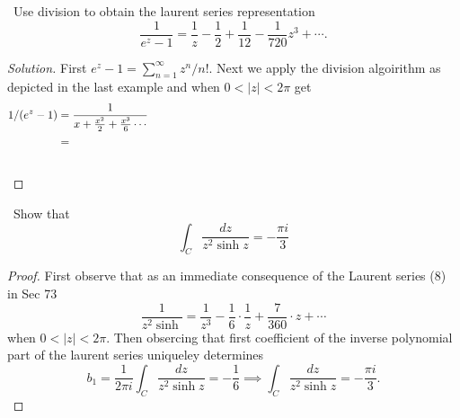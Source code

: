 \documentclass[11pt]{amsart}
\theoremstyle{definition}
\numberwithin{theorem}{section}
\numberwithin{definition}{section}
\numberwithin{equation}{section}
\newenvironment{solution}
  {\begin{proof}[Solution]}
  {\end{proof}}
\begin{document}
\medskip {}\ Use division to obtain the laurent series representation
\begin{equation*}
 	\frac{1}{e^z - 1} = \frac{1}{z} - \frac{1}{2 } + \frac{1}{12} - \frac{1}{720}z^3 + \cdots.
 \end{equation*} 
 \begin{solution}
 	First $e^z -1 = \sum_{n=1}^\infty z^n/n!$. Next 
 	we apply the division algoirithm as depicted in the last example and when $0 < |z| < 2\pi$ get
 	\begin{equation*}
 	\begin{aligned}
 		1/(e^z - 1) &= \frac{1}{x + \frac{x^2}{2} + \frac{x^3}{6} \cdots } \;\;\;\;\;\;\;\;\;\;\;\;\;\;\;\;\;\;\;\;\;\;\;\;\;\;\;\;\;\;\;\;\;\;\;\;\;\;\;\;\;\;\;\;\;\;\;\;\;\;\;\;\;\;\;\;\;\;\;\;\;\;\;\;\;\;\;\;\;\;\;\;\;\;\;\;\;\;\;\;\;\;\;\;\;\;\;\;\;\;\;\;\;\;\;\;\;\;\;\;\hfill\\
 		&=
 	\end{aligned}
 	\end{equation*} \\[4in]
 \end{solution}

\medskip {}\ Show that \begin{equation*}
	\int_C \frac{dz}{z^2 \sinh z} = -\frac{\pi i}{3}
\end{equation*} 
\begin{proof}
	First observe that as an immediate consequence of the Laurent series (8) in Sec 73 \begin{equation*}
		\frac{1}{z^2 \sinh} = \frac{1}{z^3 } - \frac{1}{6}\cdot \frac{1}{z} + \frac{7}{360}\cdot z + \cdots
	\end{equation*}
	when $0 < |z| < 2\pi.$ Then obsercing that first  coefficient of the inverse polynomial part of the laurent series uniqueley determines
	\begin{equation*}
		b_1 = \frac{1}{2\pi i} \int_C \frac{dz}{z^2 \sinh z} = -\frac{1}{6} \implies \int_C \frac{dz}{z^2 \sinh z} = -\frac{\pi i}{3}.
	\end{equation*}
\end{proof}
\end{document}
